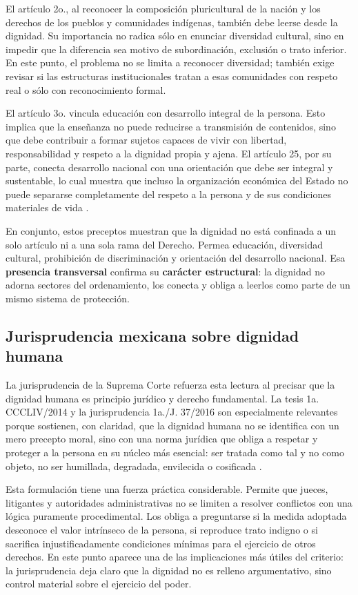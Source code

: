 \documentclass[
	spanish,
	letterpaper, oneside
]{article}
\begin{document}
El artículo 2o., al reconocer la composición pluricultural de la nación y los derechos de los pueblos y comunidades indígenas, también debe leerse desde la dignidad. Su importancia no radica sólo en enunciar diversidad cultural, sino en impedir que la diferencia sea motivo de subordinación, exclusión o trato inferior. En este punto, el problema no se limita a reconocer diversidad; también exige revisar si las estructuras institucionales tratan a esas comunidades con respeto real o sólo con reconocimiento formal.

El artículo 3o. vincula educación con desarrollo integral de la persona. Esto implica que la enseñanza no puede reducirse a transmisión de contenidos, sino que debe contribuir a formar sujetos capaces de vivir con libertad, responsabilidad y respeto a la dignidad propia y ajena. El artículo 25, por su parte, conecta desarrollo nacional con una orientación que debe ser integral y sustentable, lo cual muestra que incluso la organización económica del Estado no puede separarse completamente del respeto a la persona y de sus condiciones materiales de vida \citep{constitucionCPEUM2026}.

En conjunto, estos preceptos muestran que la dignidad no está confinada a un solo artículo ni a una sola rama del Derecho. Permea educación, diversidad cultural, prohibición de discriminación y orientación del desarrollo nacional. Esa \textbf{presencia transversal} confirma su \textbf{carácter estructural}: la dignidad no adorna sectores del ordenamiento, los conecta y obliga a leerlos como parte de un mismo sistema de protección.
\subsection{Jurisprudencia mexicana sobre dignidad humana}

La jurisprudencia de la Suprema Corte refuerza esta lectura al precisar que la dignidad humana es principio jurídico y derecho fundamental. La tesis 1a. CCCLIV/2014 y la jurisprudencia 1a./J. 37/2016 son especialmente relevantes porque sostienen, con claridad, que la dignidad humana no se identifica con un mero precepto moral, sino con una norma jurídica que obliga a respetar y proteger a la persona en su núcleo más esencial: ser tratada como tal y no como objeto, no ser humillada, degradada, envilecida o cosificada \citep{scjnTesis2007731,scjnJur37_2016}.

Esta formulación tiene una fuerza práctica considerable. Permite que jueces, litigantes y autoridades administrativas no se limiten a resolver conflictos con una lógica puramente procedimental. Los obliga a preguntarse si la medida adoptada desconoce el valor intrínseco de la persona, si reproduce trato indigno o si sacrifica injustificadamente condiciones mínimas para el ejercicio de otros derechos. En este punto aparece una de las implicaciones más útiles del criterio: la jurisprudencia deja claro que la dignidad no es relleno argumentativo, sino control material sobre el ejercicio del poder.
\end{document}
